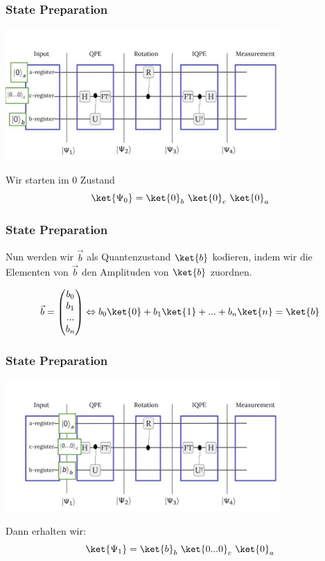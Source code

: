 \begin{frame}
    \frametitle{State Preparation}
    \begin{center}

    \includegraphics[width=10.5cm]{img/hhl_circuit/hhl_circuit_0.jpg}
    \end{center}

    Wir starten im 0 Zustand
    $$\ket{\Psi_0} = \ket{0}_b\ \ket{0}_c\ \ket{0}_a$$


\end{frame}


\begin{frame}
    \frametitle{State Preparation}
    
    \hfil

    Nun werden wir $\vec{b}$ als Quantenzustand $\ket{b}$ kodieren, 
    indem wir die Elementen von $\vec{b}$ den Amplituden von $\ket{b}$ zuordnen.

    $$\vec{b}=\begin{pmatrix} b_0 \\ b_1 \\ ... \\b_n \end{pmatrix}
        \Leftrightarrow b_0 \ket{0} + b_1 \ket{1} + ... + b_n \ket{n} = \ket{b}$$

    \hfil

\end{frame}
\begin{frame}
    \frametitle{State Preparation}
    \begin{center}
    \includegraphics[width=10.5cm]{img/hhl_circuit/hhl_circuit_1.jpg}
    \end{center}

    Dann erhalten wir:
    $$\ket{\Psi_1} = \ket{b}_b\ \ket{0...0}_c\ \ket{0}_a$$


\end{frame}

